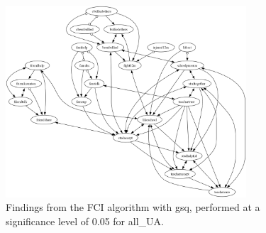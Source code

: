 \begin{figure}[htbp]
    \centering
    \includegraphics[width=0.8\textwidth]{Report/final_report/pictures/FCI_gsq_0.05_all_UA.png}
    \caption{Findings from the FCI algorithm with gsq, performed at a significance level of 0.05 for all_UA.}
    \label{fig:fci_gsq_0.05all_UA}
\end{figure}
